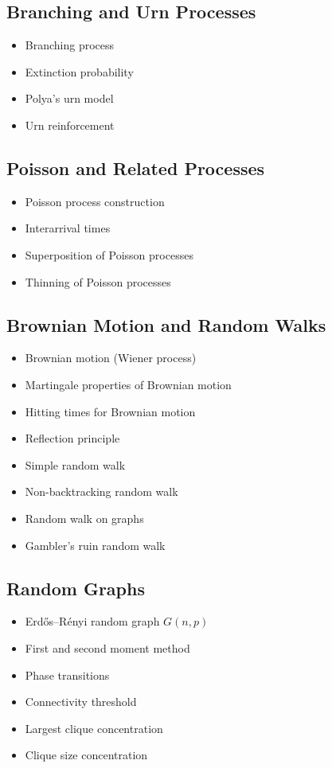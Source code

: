 \documentclass{amsart}
\begin{document}
\subsection{Branching and Urn Processes}
\begin{itemize}
  \item Branching process
  \item Extinction probability
  \item Polya's urn model
  \item Urn reinforcement
\end{itemize}

\subsection{Poisson and Related Processes}
\begin{itemize}
  \item Poisson process construction
  \item Interarrival times
  \item Superposition of Poisson processes
  \item Thinning of Poisson processes
\end{itemize}

\subsection{Brownian Motion and Random Walks}
\begin{itemize}
  \item Brownian motion (Wiener process)
  \item Martingale properties of Brownian motion
  \item Hitting times for Brownian motion
  \item Reflection principle
  \item Simple random walk
  \item Non-backtracking random walk
  \item Random walk on graphs
  \item Gambler's ruin random walk
\end{itemize}

\subsection{Random Graphs}
\begin{itemize}
  \item Erd\H{o}s--R\'enyi random graph $G(n,p)$
  \item First and second moment method
  \item Phase transitions
  \item Connectivity threshold
  \item Largest clique concentration
  \item Clique size concentration
\end{itemize}
\end{document}
